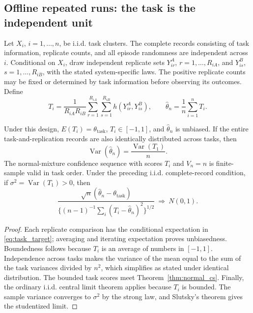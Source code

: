 \subsection{Offline repeated runs: the task is the independent unit}

Let $X_i$, $i=1,\ldots,n$, be i.i.d. task clusters. The complete records
consisting of task information, replicate counts, and all episode
randomness are independent across $i$. Conditional on $X_i$,
draw independent replicate sets
$Y_{ir}^A$, $r=1,\ldots,R_{iA}$, and
$Y_{is}^B$, $s=1,\ldots,R_{iB}$, with the stated system-specific laws.
The positive replicate counts may be fixed or determined by task
information before observing its outcomes. Define
\begin{equation}
 T_i=\frac1{R_{iA}R_{iB}}
       \sum_{r=1}^{R_{iA}}\sum_{s=1}^{R_{iB}}
               h(Y_{ir}^A,Y_{is}^B),\qquad
 \widehat\theta_n=\frac1n\sum_{i=1}^nT_i.
 \label{eq:offline_est}
\end{equation}

\begin{theorem}\label{thm:offline}
Under this design, $E(T_i)=\theta_{\mathrm{task}}$,
$T_i\in[-1,1]$, and $\widehat\theta_n$ is unbiased. If the entire
task-and-replication records are also identically distributed across tasks,
then
\[
 \operatorname{Var}(\widehat\theta_n)=\frac{\operatorname{Var}(T_1)}n.
\]
The normal-mixture confidence sequence with scores $T_i$ and $V_n=n$
is finite-sample valid in task order. Under the preceding i.i.d.
complete-record condition, if
$\sigma^2=\operatorname{Var}(T_1)>0$, then
\[
 \frac{\sqrt n(\widehat\theta_n-\theta_{\mathrm{task}})}
 {\{(n-1)^{-1}\sum_i(T_i-\widehat\theta_n)^2\}^{1/2}}
 \ \Longrightarrow\ N(0,1).
\]
\end{theorem}
\begin{proof}
Each replicate comparison has the conditional expectation in
\eqref{eq:task_target}; averaging and iterating expectation proves
unbiasedness. Boundedness follows because $T_i$ is an average of
numbers in $[-1,1]$. Independence across tasks makes the variance of
the mean equal to the sum of the task variances divided by $n^2$,
which simplifies as stated under identical distribution. The bounded
task scores meet Theorem~\ref{thm:normal_cs}. Finally, the ordinary
i.i.d. central limit theorem applies because $T_i$ is bounded. The
sample variance converges to $\sigma^2$ by the strong law, and
Slutsky's theorem gives the studentized limit.
\end{proof}

